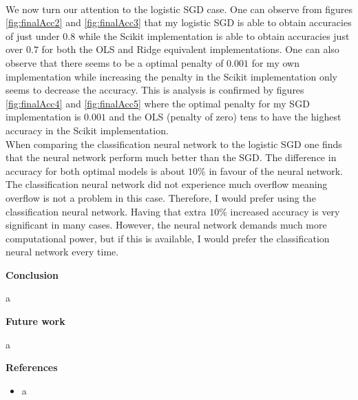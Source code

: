\documentclass[12pt,a4paper]{article}
\begin{document}
\\
We now turn our attention to the logistic SGD case. One can observe from figures \ref{fig:finalAcc2} and \ref{fig:finalAcc3} that my logistic SGD is able to obtain accuracies of just under $0.8$ while the Scikit implementation is able to obtain accuracies just over $0.7$ for both the OLS and Ridge equivalent implementations. One can also observe that there seems to be a optimal penalty of $0.001$ for my own implementation while increasing the penalty in the Scikit implementation only seems to decrease the accuracy. This is analysis is confirmed by figures \ref{fig:finalAcc4} and \ref{fig:finalAcc5} where the optimal penalty for my SGD implementation is $0.001$ and the OLS (penalty of zero) tens to have the highest accuracy in the Scikit implementation.
\\
When comparing the classification neural network to the logistic SGD one finds that the neural network perform much better than the SGD. The difference in accuracy for both optimal models is about $10\%$ in favour of the neural network. The classification neural network did not experience much overflow meaning overflow is not a problem in this case. Therefore, I would prefer using the classification neural network. Having that extra $10\%$ increased accuracy is very significant in many cases. However, the neural network demands much more computational power, but if this is available, I would prefer the classification neural network every time.

\newpage

\begin{center}
\Large{\textbf{Conclusion}}
\end{center}

\noindent a

\newpage

\begin{center}
\Large{\textbf{Future work}}
\end{center}

\noindent a

\newpage

\begin{center}
\Large{\textbf{References}}
\end{center}

\begin{itemize}
  \item a
\end{itemize}
\end{document}
